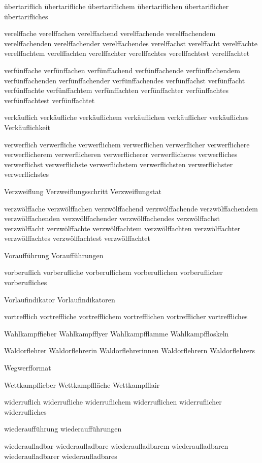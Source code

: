 übertariflich übertarifliche übertariflichem übertariflichen übertariflicher übertarifliches

verelffache verelffachen verelffachend verelffachende verelffachendem verelffachenden verelffachender verelffachendes verelffachst verelffacht verelffachte verelffachtem verelffachten verelffachter verelffachtes verelffachtest verelffachtet

verfünffache verfünffachen verfünffachend verfünffachende verfünffachendem verfünffachenden verfünffachender verfünffachendes verfünffachst verfünffacht verfünffachte verfünffachtem verfünffachten verfünffachter verfünffachtes verfünffachtest verfünffachtet

verkäuflich verkäufliche verkäuflichem verkäuflichen verkäuflicher verkäufliches Verkäuflichkeit

verwerflich verwerfliche verwerflichem verwerflichen verwerflicher verwerflichere verwerflicherem verwerflicheren verwerflicherer verwerflicheres verwerfliches verwerflichst verwerflichste verwerflichstem verwerflichsten verwerflichster verwerflichstes

Verzweiflung Verzweiflungsschritt Verzweiflungstat

verzwölffache verzwölffachen verzwölffachend verzwölffachende verzwölffachendem verzwölffachenden verzwölffachender verzwölffachendes verzwölffachst verzwölffacht verzwölffachte verzwölffachtem verzwölffachten verzwölffachter verzwölffachtes verzwölffachtest verzwölffachtet

Voraufführung Voraufführungen

vorberuflich vorberufliche vorberuflichem vorberuflichen vorberuflicher vorberufliches

Vorlaufindikator Vorlaufindikatoren

vortrefflich vortreffliche vortrefflichem vortrefflichen vortrefflicher vortreffliches

Wahlkampffieber Wahlkampfflyer Wahlkampfflamme Wahlkampffloskeln 

Waldorflehrer Waldorflehrerin Waldorflehrerinnen Waldorflehrern Waldorflehrers

Wegwerfformat

Wettkampffieber Wettkampffläche Wettkampfflair 

widerruflich widerrufliche widerruflichem widerruflichen widerruflicher widerrufliches

wiederaufführung wiederaufführungen

wiederaufladbar wiederaufladbare wiederaufladbarem wiederaufladbaren wiederaufladbarer wiederaufladbares 

